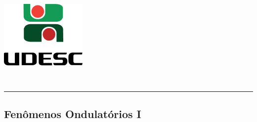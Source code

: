 \thispagestyle{empty}
\begin{center}
	\begin{minipage}[!]{\linewidth}
        \begin{minipage}[!]{.19\linewidth}
            \includegraphics[width=\linewidth]{img/logo.png}           
        \end{minipage}
        \begin{minipage}[!]{.8\linewidth}
            \center
            \ABNTEXchapterfont\normalsize\MakeUppercase{\imprimirinstituicao}
            \par
            \vspace*{10pt}                     
            \ABNTEXchapterfont\normalsize\MakeUppercase{\centro}
            \par
            \vspace*{10pt}           
            \ABNTEXchapterfont\normalsize\MakeUppercase{\disciplina}
        \end{minipage}        
    \end{minipage}
    \\ \vspace{0.5cm}
    \rule{\textwidth}{.5pt}   
\end{center}
    \textual
    \begin{center}
      \section{Fenômenos Ondulatórios I}
      \par
    \end{center}
    
